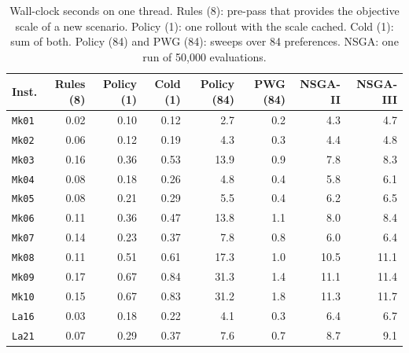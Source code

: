 \begin{table}[htbp]
\centering
\caption{Wall-clock seconds on one thread. Rules (8): pre-pass that provides the objective scale of a new scenario. Policy (1): one rollout with the scale cached. Cold (1): sum of both. Policy (84) and PWG (84): sweeps over 84 preferences. NSGA: one run of 50{,}000 evaluations.}
\label{tab:runtimeinst}
\scriptsize
\setlength{\tabcolsep}{2.4pt}
\begin{tabular}{lrrrrrrr}
\toprule
Inst. & Rules (8) & Policy (1) & Cold (1) & Policy (84) & PWG (84) & NSGA-II & NSGA-III \\
\midrule
\texttt{Mk01} & 0.02 & 0.10 & 0.12 & 2.7 & 0.2 & 4.3 & 4.7 \\
\texttt{Mk02} & 0.06 & 0.12 & 0.19 & 4.3 & 0.3 & 4.4 & 4.8 \\
\texttt{Mk03} & 0.16 & 0.36 & 0.53 & 13.9 & 0.9 & 7.8 & 8.3 \\
\texttt{Mk04} & 0.08 & 0.18 & 0.26 & 4.8 & 0.4 & 5.8 & 6.1 \\
\texttt{Mk05} & 0.08 & 0.21 & 0.29 & 5.5 & 0.4 & 6.2 & 6.5 \\
\texttt{Mk06} & 0.11 & 0.36 & 0.47 & 13.8 & 1.1 & 8.0 & 8.4 \\
\texttt{Mk07} & 0.14 & 0.23 & 0.37 & 7.8 & 0.8 & 6.0 & 6.4 \\
\texttt{Mk08} & 0.11 & 0.51 & 0.61 & 17.3 & 1.0 & 10.5 & 11.1 \\
\texttt{Mk09} & 0.17 & 0.67 & 0.84 & 31.3 & 1.4 & 11.1 & 11.4 \\
\texttt{Mk10} & 0.15 & 0.67 & 0.83 & 31.2 & 1.8 & 11.3 & 11.7 \\
\texttt{La16} & 0.03 & 0.18 & 0.22 & 4.1 & 0.3 & 6.4 & 6.7 \\
\texttt{La21} & 0.07 & 0.29 & 0.37 & 7.6 & 0.7 & 8.7 & 9.1 \\
\bottomrule
\end{tabular}
\end{table}
